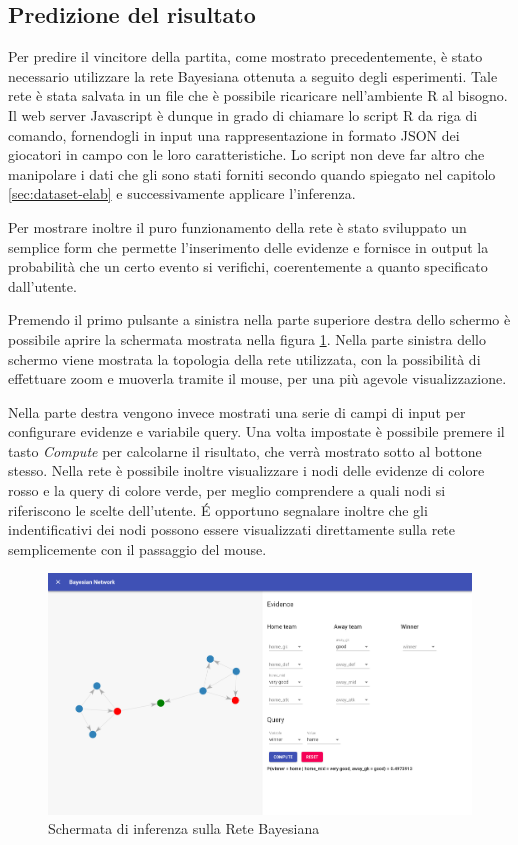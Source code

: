 \documentclass[hidelinks, 12pt]{article}
\begin{document}
\subsection{Predizione del risultato}

Per predire il vincitore della partita, come mostrato precedentemente, è stato necessario utilizzare la rete Bayesiana ottenuta a seguito degli esperimenti. Tale rete è stata salvata in un file che è possibile ricaricare nell'ambiente R al bisogno. Il web server Javascript è dunque in grado di chiamare lo script R da riga di comando, fornendogli in input una rappresentazione in formato JSON dei giocatori in campo con le loro caratteristiche. Lo script non deve far altro che manipolare i dati che gli sono stati forniti secondo quando spiegato nel capitolo \ref{sec:dataset-elab} e successivamente applicare l'inferenza.

Per mostrare inoltre il puro funzionamento della rete è stato sviluppato un semplice form che permette l'inserimento delle evidenze e fornisce in output la probabilità che un certo evento si verifichi, coerentemente a quanto specificato dall'utente.

Premendo il primo pulsante a sinistra nella parte superiore destra dello schermo è possibile aprire la schermata mostrata nella figura \ref{fig:inference_view}. Nella parte sinistra dello schermo viene mostrata la topologia della rete utilizzata, con la possibilità di effettuare zoom e muoverla tramite il mouse, per una più agevole visualizzazione. 

Nella parte destra vengono invece mostrati una serie di campi di input per configurare evidenze e variabile query. Una volta impostate è possibile premere il tasto {\it Compute} per calcolarne il risultato, che verrà mostrato sotto al bottone stesso. Nella rete è possibile inoltre visualizzare i nodi delle evidenze di colore rosso e la query di colore verde, per meglio comprendere a quali nodi si riferiscono le scelte dell'utente. \'E opportuno segnalare inoltre che gli indentificativi dei nodi possono essere visualizzati direttamente sulla rete semplicemente con il passaggio del mouse.

\begin{figure}[H]
	\centering
	\includegraphics[scale=0.35]{images/07_03_inference.png}
	\caption[Schermata di inferenza sulla Rete Bayesiana]{Schermata di inferenza sulla Rete Bayesiana}
	\label{fig:inference_view}
\end{figure}
\end{document}
